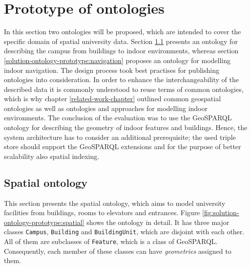 \documentclass[draft,final]{vutinfth} %
\begin{document}
\section{Prototype of ontologies}
\label{solution-ontology-prototype}
In this section two ontologies will be proposed, which are intended to cover the specific domain of spatial university data. Section \ref{solution-ontology-prototype:spatial} presents an ontology for describing the campus from buildings to indoor environments, whereas section \ref{solution-ontology-prototype:navigation} proposes an ontology for modelling indoor navigation. The design process took best practises for publishing ontologies\cite{berrueta_best_2008} into consideration. In order to enhance the interchangeability of the described data it is commonly understood to reuse terms of common ontologies, which is why chapter \ref{related-work-chapter} outlined common geospatial ontologies as well as ontologies and approaches for modelling indoor environments. The conclusion of the evaluation was to use the GeoSPARQL ontology for describing the geometry of indoor features and buildings. Hence, the system architecture has to consider an additional prerequisite; the used triple store should support the GeoSPARQL extensions and for the purpose of better scalability also spatial indexing.

\subsection{Spatial ontology}
\label{solution-ontology-prototype:spatial}
This section presents the spatial ontology, which aims to model university facilities from buildings, rooms to elevators and entrances. Figure \ref{fig:solution-ontology-prototype:spatial} shows the ontology in detail. It has three major classes \texttt{Campus},  \texttt{Building} and \texttt{BuildingUnit}, which are disjoint with each other. All of them are subclasses of \texttt{Feature}, which is a class of GeoSPARQL. Consequently, each member of these classes can have \textit{geometries} assigned to them. 
\end{document}
